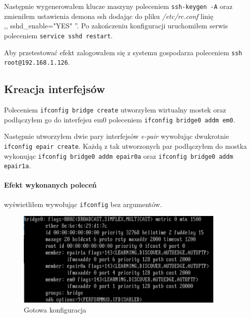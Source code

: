 \documentclass{mwart}
\begin{document}
Następnie wygenerowałem klucze maszyny poleceniem \texttt{ssh-keygen -A} oraz zmieniłem ustawienia demona ssh dodając do pliku \textit{/etc/rc.conf} linię \\ ,, sshd\_enable="YES" ''. Po zakończeniu konfiguracji uruchomiłem serwis poleceniem \texttt{service sshd restart}.

Aby przetestować efekt zalogowałem się z systemu gospodarza poleceniem \texttt{ssh root@192.168.1.126}.

\subsection{Kreacja interfejsów}
Poleceniem \texttt{ifconfig bridge create} utworzyłem wirtualny mostek oraz podłączyłem go do interfejsu em0 poleceniem \texttt{ifconfig bridge0 addm em0}.

Następnie utworzyłem dwie pary interfejsów \textit{e-pair} wywołując dwukrotnie \texttt{ifconfig epair create}. Każdą z tak utworzonych par podłączyłem do mostka wykonując \texttt{ifconfig bridge0 addm epair0a} oraz \texttt{ifconfig bridge0 addm epair1a}.

\paragraph{Efekt wykonanych poleceń} wyświetliłem wywołując \texttt{ifconfig} bez argumentów.

\begin{figure}[H]
  \includegraphics[width=0.90\textwidth]{Podlaczone_interfejsy}
  \centering
  \caption{Gotowa konfiguracja}
  \label{fig:konfiguracja_freebsd}
\end{figure}
\end{document}
